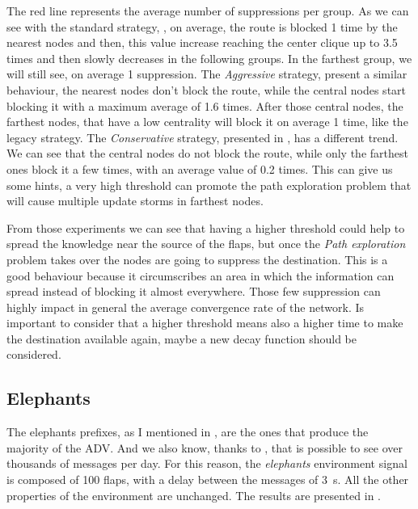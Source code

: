 The red line represents the average number of suppressions per group.
As we can see with the standard strategy, ,
on average, the route is blocked \num{1} time by the nearest nodes and then,
this value increase reaching the center clique up to \num{3.5} times and then
slowly decreases in the following groups.
In the farthest group, we will still see, on average \num{1} suppression.
The \textit{Aggressive} strategy,  present
a similar behaviour, the nearest nodes don't block the route, while the central
nodes start blocking it with a maximum average of \num{1.6} times.
After those central nodes, the farthest nodes, that have a low centrality will
block it on average \num{1} time, like the legacy strategy.
The \textit{Conservative} strategy, presented in ,
has a different trend.
We can see that the central nodes do not block the route, while only the farthest
ones block it a few times, with an average value of \num{0.2} times.
This can give us some hints, a very high threshold can promote the path
exploration problem that will cause multiple update storms in farthest nodes.

From those experiments we can see that having a higher threshold could help
to spread the knowledge near the source of the flaps, but once the
\textit{Path exploration} problem takes over the nodes are going to suppress
the destination.
This is a good behaviour because it circumscribes an area in which the
information can spread instead of blocking it almost everywhere.
Those few suppression can highly impact in general the average convergence rate
of the network.
Is important to consider that a higher threshold means also a higher time to
make the destination available again, maybe a new decay function should be considered.

\subsection{Elephants}
\label{subsec:bgp_elephants}

The elephants prefixes, as I mentioned in ,
are the ones that produce the majority of the \ac{ADV}.
And we also know, thanks to \cite{huston2006bgp}, that is possible to see over
thousands of messages per day.
For this reason, the \textit{elephants} environment signal is composed of \num{100}
flaps, with a delay between the messages of \SI{3}{\second}.
All the other properties of the environment are unchanged.
The results are presented in .

